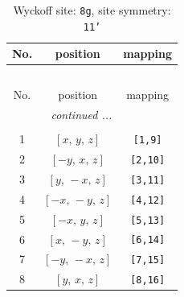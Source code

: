 \documentclass[fleqn,8pt]{jsarticle}
\begin{document}
\renewcommand{\arraystretch}{1.2}
\begin{longtable}{ccc}
\caption{Wyckoff site: {\tt 8g}, site symmetry: {\tt 11'}}
 \\
 \hline \hline
No. & position & mapping \\ \hline \endfirsthead

\multicolumn{2}{l}{\tablename\ \thetable{}} \\
 \hline \hline
No. & position & mapping \\ \hline \endhead

 \hline \hline
\multicolumn{2}{r}{\footnotesize\it continued ...} \\ \endfoot

 \hline \hline
\multicolumn{2}{r}{} \\ \endlastfoot

1 & $\left[ x,\, y,\, z \right]$ & {\tt [1,9]} \\ \hline
2 & $\left[ - y,\, x,\, z \right]$ & {\tt [2,10]} \\ \hline
3 & $\left[ y,\, - x,\, z \right]$ & {\tt [3,11]} \\ \hline
4 & $\left[ - x,\, - y,\, z \right]$ & {\tt [4,12]} \\ \hline
5 & $\left[ - x,\, y,\, z \right]$ & {\tt [5,13]} \\ \hline
6 & $\left[ x,\, - y,\, z \right]$ & {\tt [6,14]} \\ \hline
7 & $\left[ - y,\, - x,\, z \right]$ & {\tt [7,15]} \\ \hline
8 & $\left[ y,\, x,\, z \right]$ & {\tt [8,16]} \\
\end{longtable}
\end{document}
